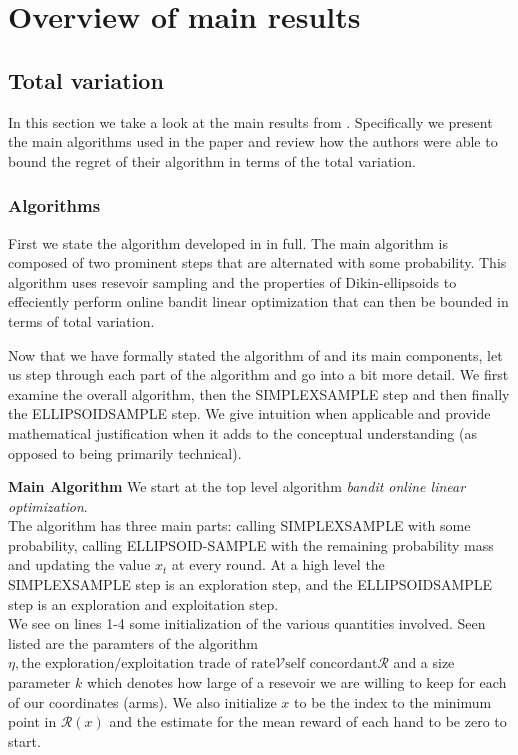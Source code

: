 \section{Overview of main results}

\subsection{Total variation}
In this section we take a look at the main results from \citep{hazan}.
Specifically we present the main algorithms used in the paper and review 
how the authors were able to bound the regret of their algorithm in terms 
of the total variation.


\subsubsection{Algorithms}
First we state the algorithm developed in \citep{hazan} in full. The
main algorithm is composed of two prominent steps that are alternated with 
some probability. This algorithm uses resevoir sampling and the 
properties of Dikin-ellipsoids to effeciently perform online bandit linear
optimization that can then be bounded in terms of total variation.





Now that we have formally stated the algorithm of \citep{hazan} and its main
components, let us step through each part of the algorithm and go into a 
bit more detail. We first examine the overall algorithm, then the 
SIMPLEXSAMPLE step and then finally the ELLIPSOIDSAMPLE step. We
give intuition when applicable and provide mathematical justification when
it adds to the conceptual understanding (as opposed to being primarily technical).

\textbf{Main Algorithm}
We start at the top level algorithm \textit{bandit online linear optimization}.\\

The algorithm has three main parts: calling SIMPLEXSAMPLE with some probability, calling ELLIPSOID-SAMPLE
with the remaining probability mass and updating the value $x_t$ at every round. At a high level the SIMPLEXSAMPLE step is an exploration step, and the ELLIPSOIDSAMPLE step is an exploration and exploitation step.\\

We see on lines 1-4 some initialization of the various quantities involved. Seen listed are the paramters of the algorithm  $\eta, \text{the exploration/exploitation trade of rate} \mathcal{V} \text{self concordant} \mathcal{R}$ and a size parameter $k$ which denotes how large of a resevoir we are willing to keep for each of our coordinates (arms). We also initialize $x$ to be the index to the minimum point in $\mathcal{R}(x)$  and the estimate for the mean reward of each hand to be zero to start.\\

